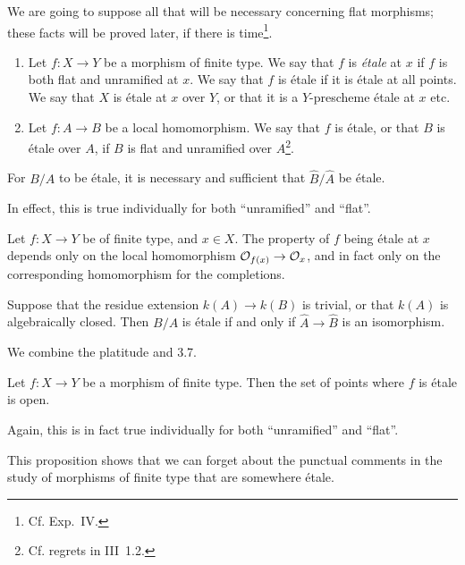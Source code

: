 \documentclass[../main.tex]{subfiles}
\begin{document}
We are going to suppose all that will be necessary concerning flat morphisms; these facts will be proved later, if there is time\footnote{Cf. Exp.~IV.}.

\begin{defn}
    \begin{enumerate}[\normalfont a)]
        \item Let $f\colon X\to Y$ be a morphism of finite type.
            We say that $f$ is \emph{étale} at $x$ if $f$ is both flat and unramified at $x$.
            We say that $f$ is étale if it is étale at all points.
            We say that $X$ is étale at $x$ over $Y$, or that it is a $Y$-prescheme étale at $x$ etc.
        \item Let $f\colon A\to B$ be a local homomorphism.
            We say that $f$ is étale, or that $B$ is étale over $A$, if $B$ is flat and unramified over $A$\footnote{Cf. regrets in III~1.2.}.
    \end{enumerate}
\end{defn}

\begin{prop}
    For $B/A$ to be étale, it is necessary and sufficient that $\hat{B}/\hat{A}$ be étale.
\end{prop}

In effect, this is true individually for both ``unramified'' and ``flat''.

\begin{cor}
    Let $f\colon X\to Y$ be of finite type, and $x\in X$.
    The property of $f$ being étale at $x$ depends only on the local homomorphism $\mathcal{O}_{f(x)}\to\mathcal{O}_x$, and in fact only on the corresponding homomorphism for the completions.
\end{cor}

\begin{cor}
    Suppose that the residue extension $k(A)\to k(B)$ is trivial, or that $k(A)$ is algebraically closed.
    Then $B/A$ is étale if and only if $\hat{A}\to\hat{B}$ is an isomorphism.
\end{cor}

We combine the platitude and 3.7.

\begin{prop}
    Let $f\colon X\to Y$ be a morphism of finite type.
    Then the set of points where $f$ is étale is open.
\end{prop}
Again, this is in fact true individually for both ``unramified'' and ``flat''.

This proposition shows that we can forget about the punctual comments in the study of morphisms of finite type that are somewhere étale.
\end{document}

